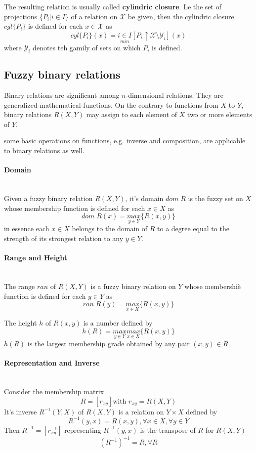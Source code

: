 \documentclass{article}
\begin{document}
The resulting relation is usually called \textbf{cylindric closure}. Le the set of projections
$\{P_i|i\in I\}$ of a relation on $\mathcal{X}$ be given, then the cylindric closure $cyl\{P_i\}$
is defined for each $x\in\mathcal{X}$ as
$$cyl\{P_i\}(x)=\underset{min}{i\in I}[P_i\uparrow\mathcal{X}\setminus\mathcal{Y}_i](x)$$
where $\mathcal{Y}_i$ denotes teh gamily of sets on which $P_i$ is defined.

\subsection{Fuzzy binary relations}
Binary relations are significant among $n$-dimensional relations. They are generalized mathematical functions.
On the contrary to functions from $X$ to $Y$, binary relations $R(X,Y)$ may assign to each element of $X$
two or more elements of $Y$.

some basic operations on functions, e.g. inverse and composition, are applicable to binary relations as well.
\paragraph{Domain}\mbox{}\\
Given a fuzzy binary relation $R(X,Y)$, it's domain $dom\;R$ is the fuzzy set on $X$ whose
membership function is defined for each $x\in X$ as
$$dom\;R(x)=\underset{y\in Y}{max}\{R(x,y)\}$$
in essence each $x\in X$ belongs to the domain of $R$ to a degree equal to the strength of its
strongest relation to any $y\in Y$.

\paragraph{Range and Height}\mbox{}\\
The range $ran$ of $R(X,Y)$ is a fuzzy binary relation on $Y$ whose membershiè function is
defined for each $y\in Y$ as
$$ran\;R(y)=\underset{x\in X}{max}\{R(x,y)\}$$

The height $h$ of $R(x,y)$ is a number defined by
$$h(R)=\underset{y\in Y}{max}\underset{x\in X}{max}\{R(x,y)\}$$
$h(R)$ is the largest membership grade obtained by any pair $(x,y)\in R$.

\paragraph{Representation and Inverse}\mbox{}\\
Consider the membership matrix
$$R=[r_{xy}]\text{with }r_{xy}=R(X,Y)$$
It's inverse $R^{-1}(Y,X)$ of $R(X,Y)$ is a relation on $Y\times X$ defined by
$$R^{-1}(y,x)=R(x,y),\forall x\in X,\forall y\in Y$$
Then $R^{-1}=[r_{xy}^{-1}]$ representing $R^{-1}(y,x)$ is the transpose of $R$ for $R(X,Y)$
$$(R^{-1})^{-1}=R,\forall R$$
\end{document}
